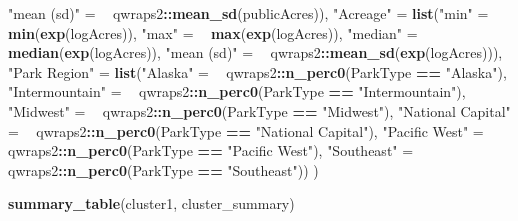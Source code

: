\documentclass[
]{article}
\newenvironment{Shaded}{\begin{snugshade}}{\end{snugshade}}
\newcommand{\ErrorTok}[1]{\textcolor[rgb]{0.64,0.00,0.00}{\textbf{#1}}}
\newcommand{\KeywordTok}[1]{\textcolor[rgb]{0.13,0.29,0.53}{\textbf{#1}}}
\newcommand{\NormalTok}[1]{#1}
\newcommand{\OperatorTok}[1]{\textcolor[rgb]{0.81,0.36,0.00}{\textbf{#1}}}
\newcommand{\StringTok}[1]{\textcolor[rgb]{0.31,0.60,0.02}{#1}}
\begin{document}
\begin{Shaded}
\begin{Highlighting}[]
            \StringTok{"mean (sd)"}\NormalTok{ =}\StringTok{ }\ErrorTok{~}\StringTok{ }\NormalTok{qwraps2}\OperatorTok{::}\KeywordTok{mean_sd}\NormalTok{(publicAcres)),}
       \StringTok{"Acreage"}\NormalTok{ =}\StringTok{ }
\StringTok{       }\KeywordTok{list}\NormalTok{(}\StringTok{"min"}\NormalTok{       =}\StringTok{ }\ErrorTok{~}\StringTok{ }\KeywordTok{min}\NormalTok{(}\KeywordTok{exp}\NormalTok{(logAcres)),}
            \StringTok{"max"}\NormalTok{       =}\StringTok{ }\ErrorTok{~}\StringTok{ }\KeywordTok{max}\NormalTok{(}\KeywordTok{exp}\NormalTok{(logAcres)),}
            \StringTok{"median"}\NormalTok{    =}\StringTok{ }\ErrorTok{~}\StringTok{ }\KeywordTok{median}\NormalTok{(}\KeywordTok{exp}\NormalTok{(logAcres)),}
            \StringTok{"mean (sd)"}\NormalTok{ =}\StringTok{ }\ErrorTok{~}\StringTok{ }\NormalTok{qwraps2}\OperatorTok{::}\KeywordTok{mean_sd}\NormalTok{(}\KeywordTok{exp}\NormalTok{(logAcres))),}
       \StringTok{"Park Region"}\NormalTok{ =}\StringTok{  }
\StringTok{       }\KeywordTok{list}\NormalTok{(}\StringTok{"Alaska"}\NormalTok{ =}\StringTok{ }\ErrorTok{~}\StringTok{ }\NormalTok{qwraps2}\OperatorTok{::}\KeywordTok{n_perc0}\NormalTok{(ParkType }\OperatorTok{==}\StringTok{ "Alaska"}\NormalTok{),}
            \StringTok{"Intermountain"}\NormalTok{ =}\StringTok{ }\ErrorTok{~}\StringTok{ }\NormalTok{qwraps2}\OperatorTok{::}\KeywordTok{n_perc0}\NormalTok{(ParkType }\OperatorTok{==}\StringTok{ "Intermountain"}\NormalTok{),}
            \StringTok{"Midwest"}\NormalTok{ =}\StringTok{ }\ErrorTok{~}\StringTok{ }\NormalTok{qwraps2}\OperatorTok{::}\KeywordTok{n_perc0}\NormalTok{(ParkType }\OperatorTok{==}\StringTok{ "Midwest"}\NormalTok{),}
            \StringTok{"National Capital"}\NormalTok{ =}\StringTok{ }\ErrorTok{~}\StringTok{ }\NormalTok{qwraps2}\OperatorTok{::}\KeywordTok{n_perc0}\NormalTok{(ParkType }\OperatorTok{==}\StringTok{ "National Capital"}\NormalTok{),}
            \StringTok{"Pacific West"}\NormalTok{ =}\StringTok{ }\ErrorTok{~}\StringTok{ }\NormalTok{qwraps2}\OperatorTok{::}\KeywordTok{n_perc0}\NormalTok{(ParkType }\OperatorTok{==}\StringTok{ "Pacific West"}\NormalTok{),}
            \StringTok{"Southeast"}\NormalTok{ =}\StringTok{ }\ErrorTok{~}\StringTok{ }\NormalTok{qwraps2}\OperatorTok{::}\KeywordTok{n_perc0}\NormalTok{(ParkType }\OperatorTok{==}\StringTok{ "Southeast"}\NormalTok{))}
\NormalTok{       )}
\end{Highlighting}
\end{Shaded}

\begin{Shaded}
\begin{Highlighting}[]
\KeywordTok{summary_table}\NormalTok{(cluster1, cluster_summary)}
\end{Highlighting}
\end{Shaded}
\end{document}
